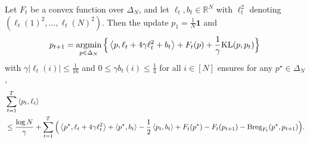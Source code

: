 \begin{lemma}\label{lem: mirror descent}
Let $F_t$ be a convex function over $\Delta_N$, and let $\ell_t, b_t\in\mathbb{R}^N$ with $\ell_t^2$ denoting $(\ell_t(1)^2, \ldots, \ell_t(N)^2)$. Then the update $p_1=\frac{1}{N}\mathbf{1}$ and 
    \begin{align*}
        p_{t+1} = \operatorname*{argmin}_{p\in\Delta_N} \Big\{ 
  \left\langle p, \ell_t + 4\gamma \ell_t^2 + b_t\right\rangle + F_t(p) + \frac{1}{\gamma}\text{KL}(p, p_t)\Big\}
    \end{align*}
    with $\gamma |\ell_t(i)|\leq \frac{1}{16}$ and $0\leq \gamma b_t(i)\leq \frac{1}{4}$ for all $i\in[N]$  ensures for any $p^\star\in\Delta_N$, 
    \begin{align*}
       &\sum_{t=1}^T \left\langle p_t,\ell_t\right\rangle \\
       &\leq \frac{\log N}{\gamma} + \sum_{t=1}^T \Big(\left\langle p^\star, \ell_t + 4\gamma\ell_t^2\right\rangle + \left\langle p^\star, b_t\right\rangle - \frac{1}{2}\left\langle p_t,b_t\right\rangle + F_t(p^\star) - F_t(p_{t+1}) - \textup{Breg}_{F_t}(p^\star, p_{t+1})\Big). 
    \end{align*}
    
\end{lemma}
